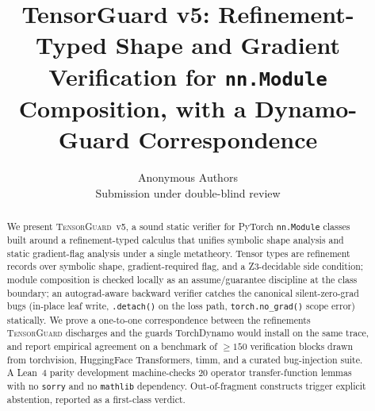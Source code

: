 \documentclass{article}
\title{TensorGuard v5: Refinement-Typed Shape and Gradient
  Verification for \texttt{nn.Module} Composition,
  with a Dynamo-Guard Correspondence}
\author{Anonymous Authors\\Submission under double-blind review}
\theoremstyle{definition}
\begin{document}
\maketitle

\begin{abstract}
We present \textsc{TensorGuard}~v5, a sound static verifier for
PyTorch \verb|nn.Module| classes built around a refinement-typed
calculus that unifies symbolic shape analysis and static
gradient-flag analysis under a single metatheory. Tensor types
are refinement records over symbolic shape, gradient-required
flag, and a Z3-decidable side condition; module composition is
checked locally as an assume/guarantee discipline at the class
boundary; an autograd-aware backward verifier catches the
canonical silent-zero-grad bugs (in-place leaf write,
\texttt{.detach()} on the loss path, \texttt{torch.no\_grad()}
scope error) statically. We prove a one-to-one correspondence
between the refinements \textsc{TensorGuard} discharges and the
guards TorchDynamo would install on the same trace, and report
empirical agreement on a benchmark of $\geq 150$ verification
blocks drawn from torchvision, HuggingFace Transformers, timm,
and a curated bug-injection suite. A Lean~4 parity development
machine-checks $20$ operator transfer-function lemmas with no
\texttt{sorry} and no \texttt{mathlib} dependency. Out-of-fragment
constructs trigger explicit abstention, reported as a
first-class verdict.
\end{abstract}



\end{document}
